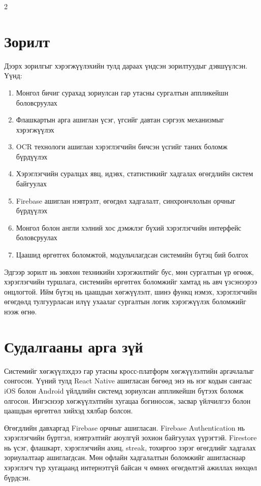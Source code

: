 \begin{multicols}{2}
\section*{Зорилт}
Дээрх зорилгыг хэрэгжүүлэхийн тулд дараах үндсэн зорилтуудыг дэвшүүлсэн. Үүнд:
\begin{enumerate}
    \item Монгол бичиг сурахад зориулсан гар утасны сургалтын аппликейшн боловсруулах
    \item Флашкартын арга ашиглан үсэг, үгсийг давтан сэргээх механизмыг хэрэгжүүлэх
    \item OCR технологи ашиглан хэрэглэгчийн бичсэн үсгийг таних боломж бүрдүүлэх
    \item Хэрэглэгчийн суралцах явц, идэвх, статистикийг хадгалах өгөгдлийн систем байгуулах
    \item Firebase ашиглан нэвтрэлт, өгөгдөл хадгалалт, синхрончлолын орчныг бүрдүүлэх
    \item Монгол болон англи хэлний хос дэмжлэг бүхий хэрэглэгчийн интерфейс боловсруулах
    \item Цаашид өргөтгөх боломжтой, модульчлагдсан системийн бүтэц бий болгох
\end{enumerate}

Эдгээр зорилт нь зөвхөн техникийн хэрэгжилтийг бус, мөн сургалтын үр өгөөж, хэрэглэгчийн туршлага, системийн өргөтгөх боломжийг хамтад нь авч үзсэнээрээ онцлогтой. Ийм бүтэц нь цаашдын хөгжүүлэлт, шинэ функц нэмэх, хэрэглэгчийн өгөгдөлд тулгуурласан илүү ухаалаг сургалтын логик хэрэгжүүлэх боломжийг нээж өгнө.

\section*{Судалгааны арга зүй}
Системийг хөгжүүлэхдээ гар утасны кросс-платформ хөгжүүлэлтийн аргачлалыг сонгосон. Үүний тулд React Native ашигласан бөгөөд энэ нь нэг кодын сангаас iOS болон Android үйлдлийн системд зориулсан аппликейшн бүтээх боломж олгосон. Ингэснээр хөгжүүлэлтийн хугацаа богиносож, засвар үйлчилгээ болон цаашдын өргөтгөл хийхэд хялбар болсон.

Өгөгдлийн давхаргад Firebase орчныг ашигласан. Firebase Authentication нь хэрэглэгчийн бүртгэл, нэвтрэлтийг аюулгүй зохион байгуулах үүрэгтэй. Firestore нь үсэг, флашкарт, хэрэглэгчийн ахиц, streak, тохиргоо зэрэг өгөгдлийг хадгалах зориулалтаар ашиглагдсан. Мөн офлайн хадгалалтын боломжийг ашигласнаар хэрэглэгч түр хугацаанд интернэтгүй байсан ч өмнөх өгөгдөлтэй ажиллах нөхцөл бүрдсэн.


\end{multicols}
